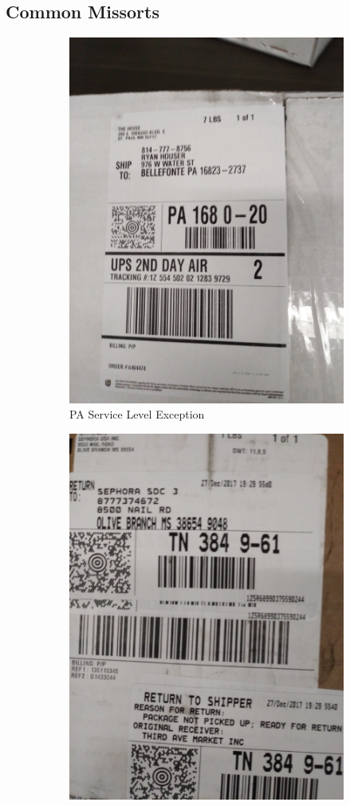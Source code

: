\documentclass[12pt]{article}
\begin{document}
\subsection{Common Missorts}

\begin{figure}[H]
\begin{subfigure}{0.5\textwidth}
\centering
\includegraphics[width=0.7\linewidth]{20180102_174408} 
\caption{PA Service Level Exception}
\end{subfigure}
\begin{subfigure}{0.5\textwidth}
\centering
\includegraphics[width=0.7\linewidth]{20171227_200358} 

\end{subfigure}
\end{figure}
\end{document}
